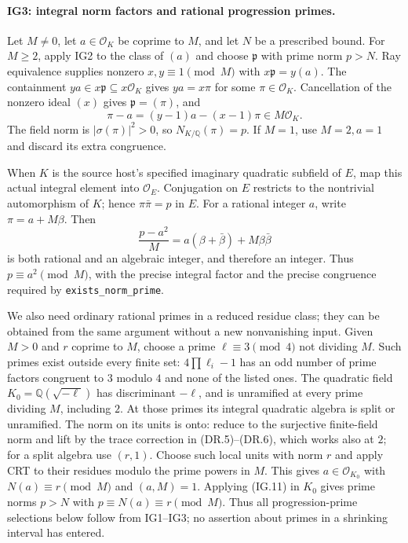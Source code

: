 \paragraph{IG3: integral norm factors and rational progression primes.}
Let $M\ne0$, let $a\in\mathcal O_K$ be coprime to $M$, and let
$N$ be a prescribed bound. For $M\ge2$, apply IG2 to the class
of $(a)$ and choose $\mathfrak p$ with prime norm $p>N$.
Ray equivalence supplies nonzero $x,y\equiv1\pmod M$ with
$x\mathfrak p=y(a)$. The containment
$ya\in x\mathfrak p\subseteq x\mathcal O_K$ gives
$ya=x\pi$ for some $\pi\in\mathcal O_K$.
Cancellation of the nonzero ideal $(x)$ gives
$\mathfrak p=(\pi)$, and
\[
       \pi-a=(y-1)a-(x-1)\pi\in M\mathcal O_K.
                                                               \tag{IG.11}
\]
The field norm is $|\sigma(\pi)|^2>0$, so
$N_{K/\mathbb Q}(\pi)=p$. If $M=1$, use $M=2,a=1$
and discard its extra congruence.

When $K$ is the source host's specified imaginary quadratic
subfield of $E$, map this actual integral element into $\mathcal O_E$.
Conjugation on $E$ restricts to the nontrivial automorphism of $K$;
hence $\pi\bar\pi=p$ in $E$. For a rational integer $a$, write
$\pi=a+M\beta$. Then
\[
 \frac{p-a^2}{M}=a(\beta+\bar\beta)+M\beta\bar\beta
                                                               \tag{IG.12}
\]
is both rational and an algebraic integer, and therefore an integer.
Thus $p\equiv a^2\pmod M$, with the precise integral factor and
the precise congruence required by \texttt{exists\_norm\_prime}.

We also need ordinary rational primes in a reduced residue class;
they can be obtained from the same argument without a new
nonvanishing input. Given $M>0$ and $r$ coprime to $M$, choose a
prime $\ell\equiv3\pmod4$ not dividing $M$. Such primes exist
outside every finite set: $4\prod\ell_i-1$ has an odd number of
prime factors congruent to $3$ modulo $4$ and none of the listed
ones. The quadratic field $K_0=\mathbb Q(\sqrt{-\ell})$ has
discriminant $-\ell$, and is unramified at every prime dividing
$M$, including $2$. At those primes its integral quadratic algebra
is split or unramified. The norm on its units is onto: reduce to
the surjective finite-field norm and lift by the trace correction
in (DR.5)--(DR.6), which works also at $2$; for a split algebra use
$(r,1)$. Choose such local units with norm $r$ and apply CRT to
their residues modulo the prime powers in $M$. This gives
$a\in\mathcal O_{K_0}$ with $N(a)\equiv r\pmod M$ and
$(a,M)=1$. Applying (IG.11) in $K_0$ gives prime norms
$p>N$ with $p\equiv N(a)\equiv r\pmod M$.
Thus all progression-prime selections below follow from IG1--IG3;
no assertion about primes in a shrinking interval has entered.

